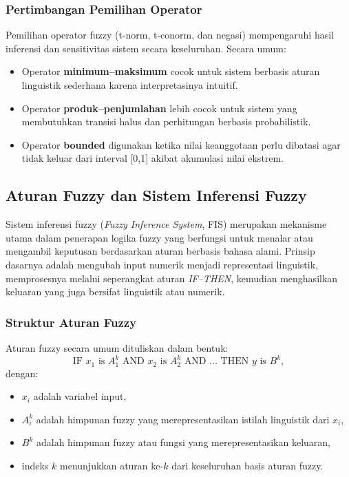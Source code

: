 \documentclass[12pt,a4paper]{article}
\theoremstyle{remark}
\begin{document}
\subsubsection{Pertimbangan Pemilihan Operator}
Pemilihan operator fuzzy (t-norm, t-conorm, dan negasi) mempengaruhi hasil inferensi dan sensitivitas sistem secara keseluruhan. Secara umum:
\begin{itemize}
    \item Operator \textbf{minimum–maksimum} cocok untuk sistem berbasis aturan linguistik sederhana karena interpretasinya intuitif.
    \item Operator \textbf{produk–penjumlahan} lebih cocok untuk sistem yang membutuhkan transisi halus dan perhitungan berbasis probabilistik.
    \item Operator \textbf{bounded} digunakan ketika nilai keanggotaan perlu dibatasi agar tidak keluar dari interval [0,1] akibat akumulasi nilai ekstrem.
\end{itemize}

\subsection{Aturan Fuzzy dan Sistem Inferensi Fuzzy}

Sistem inferensi fuzzy (\textit{Fuzzy Inference System}, FIS) merupakan mekanisme utama dalam penerapan logika fuzzy yang berfungsi untuk menalar atau mengambil keputusan berdasarkan aturan berbasis bahasa alami. Prinsip dasarnya adalah mengubah input numerik menjadi representasi linguistik, memprosesnya melalui seperangkat aturan \textit{IF–THEN}, kemudian menghasilkan keluaran yang juga bersifat linguistik atau numerik.

\subsubsection{Struktur Aturan Fuzzy}

Aturan fuzzy secara umum dituliskan dalam bentuk:
\[
    \text{IF } x_1 \text{ is } A_1^k \text{ AND } x_2 \text{ is } A_2^k \text{ AND } \dots \text{ THEN } y \text{ is } B^k,
\]
dengan:
\begin{itemize}
    \item \(x_i\) adalah variabel input,
    \item \(A_i^k\) adalah himpunan fuzzy yang merepresentasikan istilah linguistik dari \(x_i\),
    \item \(B^k\) adalah himpunan fuzzy atau fungsi yang merepresentasikan keluaran,
    \item indeks \(k\) menunjukkan aturan ke-\(k\) dari keseluruhan basis aturan fuzzy.
\end{itemize}
\end{document}
